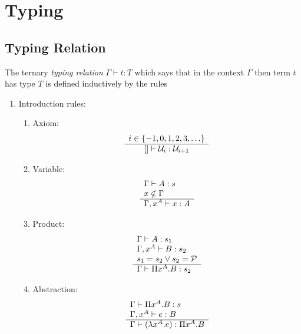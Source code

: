 \section{Typing}









\subsection{Typing Relation}


\begin{definition}
The ternary \emph{typing relation} $\Gamma \vdash t: T$ which says that in
the context $\Gamma$ then term $t$ has type $T$ is defined inductively by
the rules
\begin{enumerate}
    \item Introduction rules:
    \begin{enumerate}
        \item Axiom:
            $$
            \begin{array}{c} i \in \{-1, 0, 1, 2, 3, \ldots \} \\ \hline  [] \vdash {\cal U}_i : {\cal U}_{i + 1}\end{array}
            $$

        \item Variable:
            $$
            \begin{array}{l} 
                \Gamma \vdash A: s
                \\
                x \notin \Gamma
             \\ \hline 
                \Gamma, x^A \vdash x: A
            \end{array}
            $$

        \item Product:
            $$
            \begin{array}{l} 
                \Gamma \vdash A: s_1
                \\
                \Gamma, x^A \vdash B: s_2
                \\
                s_1 = s_2 \lor s_2 = {\cal P}
             \\ \hline 
                \Gamma \vdash \Pi x^A.B : s_2
            \end{array}
            $$

        \item Abstraction:
            $$
            \begin{array}{l} 
                \Gamma \vdash \Pi x^A. B: s
                \\
                \Gamma, x^A \vdash e: B
             \\ \hline 
                \Gamma \vdash (\lambda x^A. e): \Pi x^A. B
            \end{array}
            $$


\end{enumerate}
\end{enumerate}
\end{definition}
